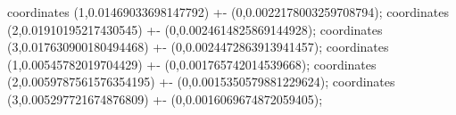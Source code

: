 coordinates {(1,0.01469033698147792) +- (0,0.0022178003259708794)};
coordinates {(2,0.01910195217430545) +- (0,0.0024614825869144928)};
coordinates {(3,0.017630900180494468) +- (0,0.0024472863913941457)};
coordinates {(1,0.00545782019704429) +- (0,0.001765742014539668)};
coordinates {(2,0.0059787561576354195) +- (0,0.0015350579881229624)};
coordinates {(3,0.005297721674876809) +- (0,0.0016069674872059405)};
